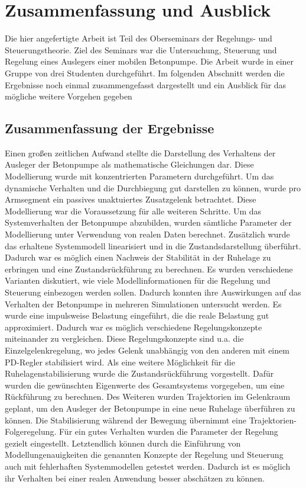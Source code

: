 \chapter{Zusammenfassung und Ausblick}
Die hier angefertigte Arbeit ist Teil des Oberseminars der Regelungs- und Steuerungstheorie. Ziel des Seminars war die Untersuchung, Steuerung und Regelung eines Auslegers einer mobilen Betonpumpe. Die Arbeit wurde in einer Gruppe von drei Studenten durchgeführt. Im folgenden Abschnitt werden die Ergebnisse noch einmal zusammengefasst dargestellt und ein Ausblick für das mögliche weitere Vorgehen gegeben
  
\section{Zusammenfassung der Ergebnisse}
Einen großen zeitlichen Aufwand stellte die Darstellung des Verhaltens der Ausleger der Betonpumpe als mathematische Gleichungen dar. Diese Modellierung wurde mit konzentrierten Parametern durchgeführt. Um das dynamische Verhalten und die Durchbiegung gut darstellen zu können, wurde pro Armsegment ein passives unaktuiertes Zusatzgelenk betrachtet. Diese Modellierung war die Voraussetzung für alle weiteren Schritte.\newline
Um das Systemverhalten der Betonpumpe abzubilden, wurden sämtliche Parameter der Modellierung unter Verwendung von realen Daten berechnet. \newline
Zusätzlich wurde das erhaltene Systemmodell linearisiert und in die Zustandsdarstellung überführt. Dadurch war es möglich einen Nachweis der Stabilität in der Ruhelage zu erbringen und eine Zustandsrückführung zu berechnen.\newline
Es wurden verschiedene Varianten diskutiert, wie viele Modellinformationen für die Regelung und Steuerung einbezogen werden sollen. Dadurch konnten ihre Auswirkungen auf das Verhalten der Betonpumpe in mehreren Simulationen untersucht werden.\newline
Es wurde eine impulsweise Belastung eingeführt, die die reale Belastung gut approximiert. Dadurch war es möglich verschiedene Regelungskonzepte miteinander zu vergleichen.\newline
Diese Regelungskonzepte sind u.a. die Einzelgelenkregelung, wo jedes Gelenk unabhängig von den anderen mit einem PD-Regler stabilisiert wird. Als eine weitere Möglichkeit für die Ruhelagenstabilisierung wurde die Zustandsrückführung vorgestellt. Dafür wurden die gewünschten Eigenwerte des Gesamtsystems vorgegeben, um eine Rückführung zu berechnen.\newline
Des Weiteren wurden Trajektorien im Gelenkraum geplant, um den Ausleger der Betonpumpe in eine neue Ruhelage überführen zu können. Die Stabilisierung während der Bewegung übernimmt eine Trajektorien-Folgeregelung. Für ein gutes Verhalten wurden die Parameter der Regelung gezielt eingestellt.\newline 
Letztendlich können durch die Einführung von Modellungenauigkeiten die genannten Konzepte der Regelung und Steuerung auch mit fehlerhaften Systemmodellen getestet werden. Dadurch ist es möglich ihr Verhalten bei einer realen Anwendung besser abschätzen zu können.
